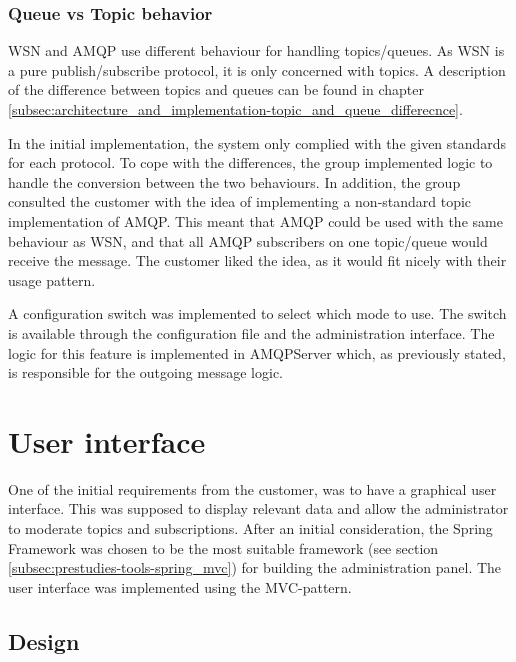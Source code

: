 \subsubsection{Queue vs Topic behavior}
WSN and AMQP use different behaviour for handling topics/queues. As WSN is a pure publish/subscribe protocol, it is only concerned with topics. A description of the difference between topics and queues can be found in chapter \ref{subsec:architecture_and_implementation-topic_and_queue_differecnce}.

In the initial implementation, the system only complied with the given standards for each protocol. To cope with the differences, the group implemented logic to handle the conversion between the two behaviours. In addition, the group consulted the customer with the idea of implementing a non-standard topic implementation of AMQP. This meant that AMQP could be used with the same behaviour as WSN, and that all AMQP subscribers on one topic/queue would receive the message. The customer liked the idea, as it would fit nicely with their usage pattern. 

A configuration switch was implemented to select which mode to use. The switch is available through the configuration file and the administration interface. The logic for this feature is implemented in AMQPServer which, as previously stated, is responsible for the outgoing message logic.


\section{User interface}
\label{sec:architecture_and_implementation-user_interface}

One of the initial requirements from the customer, was to have a graphical user interface. This was supposed to display relevant data and allow the administrator to moderate topics and subscriptions. After an initial consideration, the Spring Framework was chosen to be the most suitable framework (see section  \ref{subsec:prestudies-tools-spring_mvc}) for building the administration panel. The user interface was implemented using the MVC-pattern. 

\subsection{Design}
\label{subsec:architecture_and_implementation-user_interface-design}

